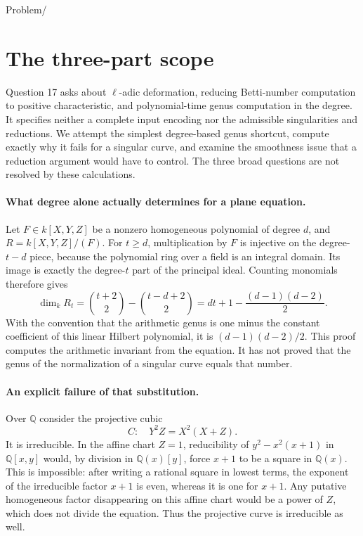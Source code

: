 \documentclass[11pt]{article}
\begin{document}
Problem/

\section{The three-part scope}
Question 17 asks about $\ell$-adic deformation, reducing Betti-number
computation to positive characteristic, and polynomial-time genus
computation in the degree. It specifies neither a complete input
encoding nor the admissible singularities and reductions. We attempt
the simplest degree-based genus shortcut, compute exactly why it fails
for a singular curve, and examine the smoothness issue that a reduction
argument would have to control. The three broad questions are not
resolved by these calculations.

\paragraph{What degree alone actually determines for a plane equation.}
Let $F\in k[X,Y,Z]$ be a nonzero homogeneous polynomial of degree
$d$, and $R=k[X,Y,Z]/(F)$. For $t\ge d$, multiplication by $F$
is injective on the degree-$t-d$ piece, because the polynomial ring
over a field is an integral domain. Its image is exactly the
degree-$t$ part of the principal ideal. Counting monomials therefore
gives
\[
\dim_k R_t=\binom{t+2}{2}-\binom{t-d+2}{2}
 =dt+1-\frac{(d-1)(d-2)}2.
\]
With the convention that the arithmetic genus is one minus the
constant coefficient of this linear Hilbert polynomial, it is
$(d-1)(d-2)/2$. This proof computes the arithmetic invariant from
the equation. It has not proved that the genus of the normalization
of a singular curve equals that number.

\paragraph{An explicit failure of that substitution.}
Over $\mathbb Q$ consider the projective cubic
\[
C:\quad Y^2Z=X^2(X+Z).
\]
It is irreducible. In the affine chart $Z=1$, reducibility of
$y^2-x^2(x+1)$ in $\mathbb Q[x,y]$ would, by division in
$\mathbb Q(x)[y]$, force $x+1$ to be a square in $\mathbb Q(x)$.
This is impossible: after writing a rational square in lowest terms,
the exponent of the irreducible factor $x+1$ is even, whereas it
is one for $x+1$. Any putative homogeneous factor disappearing on
this affine chart would be a power of $Z$, which does not divide
the equation. Thus the projective curve is irreducible as well.
\end{document}
